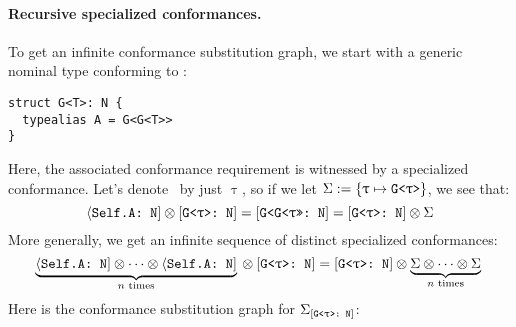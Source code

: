 \documentclass[../generics]{subfiles}
\begin{document}
\paragraph{Recursive specialized conformances.}
To get an infinite conformance substitution graph, we start with a generic nominal type conforming to \tN:
\begin{Verbatim}
struct G<T>: N {
  typealias A = G<G<T>>
}
\end{Verbatim}
Here, the associated conformance requirement is witnessed by a specialized conformance. Let's denote \rT\ by just $\uptau$, so if we let $\Sigma := \{\texttt{$\uptau$} \mapsto \texttt{G<$\uptau$>}\}$, we see that:
\[
\langle\texttt{Self.A:~N}] \otimes [\texttt{G<$\uptau$>:~N}] = [\texttt{G<G<$\uptau$>>:~N}] = [\texttt{G<$\uptau$>:~N}] \otimes \Sigma
\]
More generally, we get an infinite sequence of distinct specialized conformances:
\[
\underbrace{\langle\texttt{Self.A:~N}]\otimes\cdots\otimes\langle\texttt{Self.A:~N}]}_{\textrm{$n$ times}}{} \otimes [\texttt{G<$\uptau$>:~N}] = [\texttt{G<$\uptau$>:~N}] \otimes \underbrace{\Sigma\otimes\cdots\otimes \Sigma}_{\textrm{$n$ times}}{}
\]
Here is the conformance substitution graph for $\Sigma_{[\texttt{G<$\uptau$>:~N}]}$:
\begin{center}
\end{center}
\end{document}

